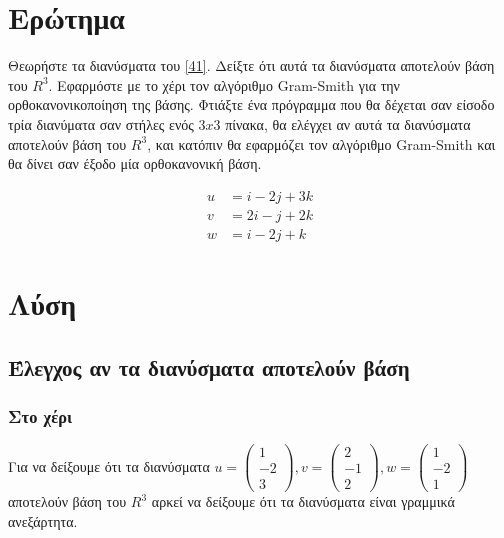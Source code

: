 \documentclass[12pt, fleqn, leqno]{extreport}
\begin{document}
\section{Ερώτημα}

Θεωρήστε τα διανύσματα του \eqref{41}. Δείξτε ότι αυτά τα διανύσματα αποτελούν βάση του $R^{3}$. Εφαρμόστε με το χέρι τον αλγόριθμο Gram-Smith για την ορθοκανονικοποίηση της βάσης. Φτιάξτε ένα πρόγραμμα που θα δέχεται σαν είσοδο τρία διανύματα σαν στήλες ενός $3x3$ πίνακα, θα ελέγχει αν αυτά τα διανύσματα αποτελούν βάση του $R^{3}$, και κατόπιν θα εφαρμόζει τον αλγόριθμο Gram-Smith και θα δίνει σαν έξοδο μία ορθοκανονική βάση.

\begin{equation}
    \begin{aligned}
        u & = i - 2j + 3k \\
        v & = 2i - j + 2k \\
        w & = i - 2j + k
    \end{aligned}\label{41}
\end{equation}

\newpage
\section{Λύση}

\subsection{Έλεγχος αν τα διανύσματα αποτελούν βάση}

\subsubsection{Στο χέρι}

Για να δείξουμε ότι τα διανύσματα 
$
    u = \begin{pmatrix}
        1 \\ -2 \\ 3
    \end{pmatrix},
    v = \begin{pmatrix}
        2 \\ -1 \\ 2
    \end{pmatrix},
    w = \begin{pmatrix}
        1 \\ -2 \\ 1
    \end{pmatrix}
$
αποτελούν βάση του $R^{3}$ αρκεί να δείξουμε ότι τα διανύσματα είναι γραμμικά ανεξάρτητα.
\end{document}
